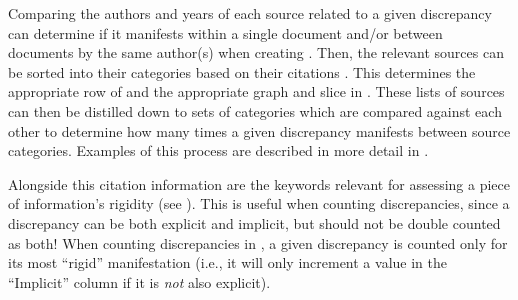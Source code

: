 Comparing the authors and years of each source related to a given discrepancy
can determine if it manifests within a single document and/or between documents
by the same author(s) when creating . Then, the
relevant sources can be sorted into their categories based on their citations
.
This determines
the appropriate row of  and the appropriate
graph and slice in . These lists of sources can then
be distilled down to sets of categories which are compared against
each other to determine how many times a given discrepancy manifests between
source categories. Examples of this process are described in more detail in
.

\label{auto-discrep-analysis-rigidity}
Alongside this citation information are the keywords relevant for assessing a
piece of information's rigidity (see ). This is useful when
counting discrepancies, since a discrepancy can be both explicit and implicit,
but should not be double counted as both! When counting
discrepancies in , a given discrepancy is
counted only for its most ``rigid'' manifestation (i.e., it will only increment
a value in the ``Implicit'' column if it is \emph{not} also explicit).

